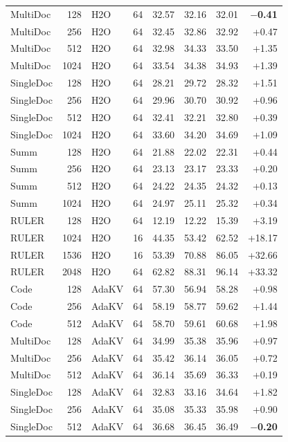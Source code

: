 \begin{table}[!b]
\begin{tabular}{@{}l r l r r r r r@{}}
    MultiDoc & 128 & H2O & 64 & 32.57 & 32.16 & 32.01 & \textbf{$-$0.41} \\
    MultiDoc & 256 & H2O & 64 & 32.45 & 32.86 & 32.92 & +0.47 \\
    MultiDoc & 512 & H2O & 64 & 32.98 & 34.33 & 33.50 & +1.35 \\
    MultiDoc & 1024 & H2O & 64 & 33.54 & 34.38 & 34.93 & +1.39 \\
    SingleDoc & 128 & H2O & 64 & 28.21 & 29.72 & 28.32 & +1.51 \\
    SingleDoc & 256 & H2O & 64 & 29.96 & 30.70 & 30.92 & +0.96 \\
    SingleDoc & 512 & H2O & 64 & 32.41 & 32.21 & 32.80 & +0.39 \\
    SingleDoc & 1024 & H2O & 64 & 33.60 & 34.20 & 34.69 & +1.09 \\
    Summ & 128 & H2O & 64 & 21.88 & 22.02 & 22.31 & +0.44 \\
    Summ & 256 & H2O & 64 & 23.13 & 23.17 & 23.33 & +0.20 \\
    Summ & 512 & H2O & 64 & 24.22 & 24.35 & 24.32 & +0.13 \\
    Summ & 1024 & H2O & 64 & 24.97 & 25.11 & 25.32 & +0.34 \\
    RULER & 128 & H2O & 64 & 12.19 & 12.22 & 15.39 & +3.19 \\
    RULER & 1024 & H2O & 16 & 44.35 & 53.42 & 62.52 & +18.17 \\
    RULER & 1536 & H2O & 16 & 53.39 & 70.88 & 86.05 & +32.66 \\
    RULER & 2048 & H2O & 64 & 62.82 & 88.31 & 96.14 & +33.32 \\
    Code & 128 & AdaKV & 64 & 57.30 & 56.94 & 58.28 & +0.98 \\
    Code & 256 & AdaKV & 64 & 58.19 & 58.77 & 59.62 & +1.44 \\
    Code & 512 & AdaKV & 64 & 58.70 & 59.61 & 60.68 & +1.98 \\
    MultiDoc & 128 & AdaKV & 64 & 34.99 & 35.38 & 35.96 & +0.97 \\
    MultiDoc & 256 & AdaKV & 64 & 35.42 & 36.14 & 36.05 & +0.72 \\
    MultiDoc & 512 & AdaKV & 64 & 36.14 & 35.69 & 36.33 & +0.19 \\
    SingleDoc & 128 & AdaKV & 64 & 32.83 & 33.16 & 34.64 & +1.82 \\
    SingleDoc & 256 & AdaKV & 64 & 35.08 & 35.33 & 35.98 & +0.90 \\
    SingleDoc & 512 & AdaKV & 64 & 36.68 & 36.45 & 36.49 & \textbf{$-$0.20} \\

\end{tabular}
\end{table}

